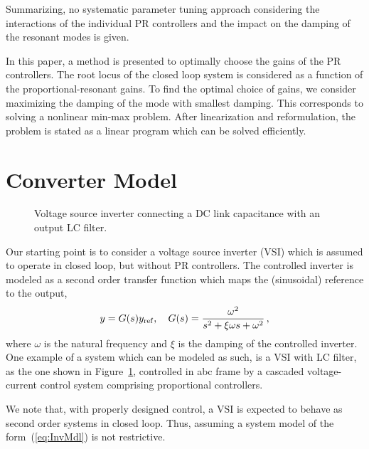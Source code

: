\documentclass[conference,10pt]{IEEEtran}
\begin{document}
Summarizing, no systematic parameter tuning approach considering the interactions of the individual PR controllers and the impact on the damping of the resonant modes is given.

In this paper, a method is presented to optimally choose the gains of the PR controllers. The root locus of the closed loop system is considered as a function of the proportional-resonant gains. To find the optimal choice of gains, we consider maximizing the damping of the mode with smallest damping. This corresponds to solving a nonlinear min-max problem. After linearization and reformulation, the problem is stated as a linear program which can be solved efficiently.






\section{Converter Model}

\begin{figure}[!h]
\centering

\caption{Voltage source inverter connecting a DC link capacitance with an output LC filter.}
\label{fig:VoltageSourceInverter}
\end{figure}

Our starting point is to consider a voltage source inverter (VSI) which is assumed to operate in closed loop, but without PR controllers.  The controlled inverter is modeled as a second order transfer function which maps the (sinusoidal) reference to the output,
\begin{align}
\label{eq:InvMdl}
y = G(s)y_{\rm ref},\quad G(s) = \frac{\omega^2}{s^2+\xi\omega s + \omega^2}\,,
\end{align}
where $\omega$ is the natural frequency and $\xi$ is the damping of the controlled inverter. One example of a system which can be modeled as such,
is a VSI with LC filter, as the one shown in Figure~\ref{fig:VoltageSourceInverter}, controlled in abc frame by a cascaded voltage-current control system comprising proportional controllers.

We note that, with properly designed control, a VSI is expected to behave as second order systems in closed loop. Thus, assuming a system model of the form~(\ref{eq:InvMdl}) is not restrictive.
\end{document}
